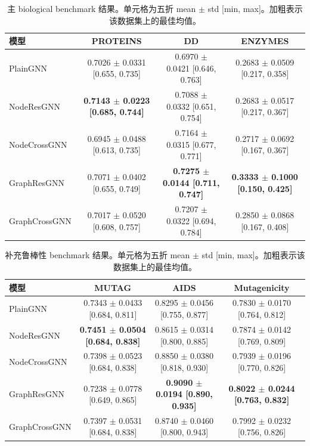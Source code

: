 \begin{table}[t]
\centering
\scriptsize
\setlength{\tabcolsep}{3pt}
\caption{主 biological benchmark 结果。单元格为五折 mean $\pm$ std [min, max]。加粗表示该数据集上的最佳均值。}
\label{tab:all_results_1}
\begin{tabular}{lccc}
\toprule
模型 & PROTEINS & DD & ENZYMES \\
\midrule
PlainGNN & 0.7026 $\pm$ 0.0331 [0.655, 0.735] & 0.6970 $\pm$ 0.0421 [0.646, 0.763] & 0.2683 $\pm$ 0.0509 [0.217, 0.358] \\
NodeResGNN & \textbf{0.7143 $\pm$ 0.0223 [0.685, 0.744]} & 0.7088 $\pm$ 0.0332 [0.651, 0.754] & 0.2683 $\pm$ 0.0517 [0.217, 0.367] \\
NodeCrossGNN & 0.6945 $\pm$ 0.0488 [0.613, 0.735] & 0.7164 $\pm$ 0.0315 [0.677, 0.771] & 0.2717 $\pm$ 0.0692 [0.167, 0.367] \\
GraphResGNN & 0.7071 $\pm$ 0.0402 [0.655, 0.749] & \textbf{0.7275 $\pm$ 0.0144 [0.711, 0.747]} & \textbf{0.3333 $\pm$ 0.1000 [0.150, 0.425]} \\
GraphCrossGNN & 0.7017 $\pm$ 0.0520 [0.608, 0.757] & 0.7207 $\pm$ 0.0322 [0.694, 0.784] & 0.2850 $\pm$ 0.0868 [0.167, 0.408] \\
\bottomrule
\end{tabular}
\end{table}

\begin{table}[t]
\centering
\scriptsize
\setlength{\tabcolsep}{3pt}
\caption{补充鲁棒性 benchmark 结果。单元格为五折 mean $\pm$ std [min, max]。加粗表示该数据集上的最佳均值。}
\label{tab:all_results_2}
\begin{tabular}{lccc}
\toprule
模型 & MUTAG & AIDS & Mutagenicity \\
\midrule
PlainGNN & 0.7343 $\pm$ 0.0433 [0.684, 0.811] & 0.8295 $\pm$ 0.0456 [0.755, 0.877] & 0.7830 $\pm$ 0.0170 [0.764, 0.812] \\
NodeResGNN & \textbf{0.7451 $\pm$ 0.0504 [0.684, 0.838]} & 0.8615 $\pm$ 0.0314 [0.800, 0.885] & 0.7874 $\pm$ 0.0142 [0.769, 0.809] \\
NodeCrossGNN & 0.7398 $\pm$ 0.0523 [0.684, 0.838] & 0.8850 $\pm$ 0.0380 [0.818, 0.930] & 0.7939 $\pm$ 0.0196 [0.770, 0.826] \\
GraphResGNN & 0.7238 $\pm$ 0.0778 [0.649, 0.865] & \textbf{0.9090 $\pm$ 0.0194 [0.890, 0.935]} & \textbf{0.8022 $\pm$ 0.0244 [0.763, 0.832]} \\
GraphCrossGNN & 0.7397 $\pm$ 0.0531 [0.684, 0.838] & 0.8740 $\pm$ 0.0460 [0.800, 0.943] & 0.7992 $\pm$ 0.0232 [0.756, 0.826] \\
\bottomrule
\end{tabular}
\end{table}

